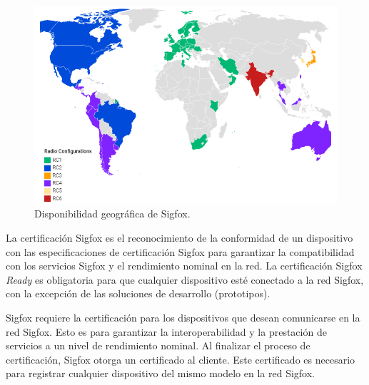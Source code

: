 \begin{figure}[h]
	\centering
	\includegraphics[scale=.65]{./Figures/coverageSigfox.PNG}
	\caption{Disponibilidad geográfica de Sigfox\protect\footnotemark.}
	\label{fig:coverageSigfox}
\end{figure}
La certificación Sigfox es el reconocimiento de la conformidad de un dispositivo con las especificaciones de certificación Sigfox para garantizar la compatibilidad con los servicios Sigfox y el rendimiento nominal en la red. La certificación Sigfox \textit{Ready} es obligatoria para que cualquier dispositivo esté conectado a la red Sigfox, con la excepción de las soluciones de desarrollo (prototipos).

Sigfox requiere la certificación para los dispositivos que desean comunicarse en la red Sigfox. Esto es para garantizar la interoperabilidad y la prestación de servicios a un nivel de rendimiento nominal. Al finalizar el proceso de certificación, Sigfox otorga un certificado al cliente. Este certificado es necesario para registrar cualquier dispositivo del mismo modelo en la red Sigfox.

